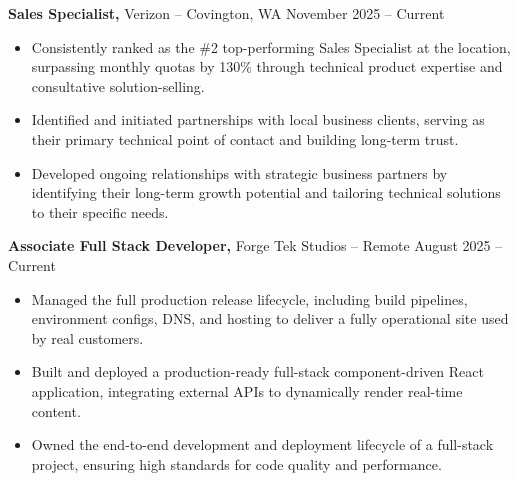 \documentclass[11pt]{article}       %
\begin{document}
\textbf{Sales Specialist,} {Verizon} -- Covington, WA \hfill November 2025 -- Current \\
\vspace{-9pt}
\begin{itemize}
  \item Consistently ranked as the \#2 top-performing Sales Specialist at the location, surpassing monthly quotas by 130\% through technical product expertise and consultative solution-selling.
  \item Identified and initiated partnerships with local business clients, serving as their primary technical point of contact and building long-term trust.
  \item Developed ongoing relationships with strategic business partners by identifying their long-term growth potential and tailoring technical solutions to their specific needs.
\end{itemize}

\textbf{Associate Full Stack Developer,} {Forge Tek Studios} -- Remote \hfill August 2025 -- Current 
\vspace{-9pt}
\begin{itemize}
  \item Managed the full production release lifecycle, including build pipelines, environment configs, DNS, and hosting to deliver a fully operational site used by real customers.
  \item Built and deployed a production-ready full-stack component-driven React application, integrating external APIs to dynamically render real-time content.
  \item Owned the end-to-end development and deployment lifecycle of a full-stack project, ensuring high standards for code quality and performance.
\end{itemize}

\end{document}
